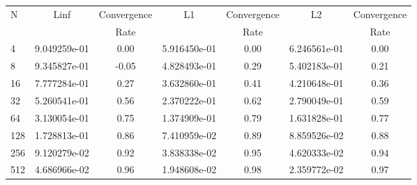 \documentclass[12pt]{article}
\begin{document}
	\begin{tabular}{l|c|c|c|c|c|c}
		N&Linf&Convergence&L1&Convergence&L2&Convergence\\
		&&Rate&&Rate&&Rate\\
		\hline
		4&9.049259e-01&0.00&5.916450e-01&0.00&6.246561e-01&0.00\\
		\hline
		8&9.345827e-01&-0.05&4.828493e-01&0.29&5.402183e-01&0.21\\
		\hline
		16&7.777284e-01&0.27&3.632860e-01&0.41&4.210648e-01&0.36\\
		\hline
		32&5.260541e-01&0.56&2.370222e-01&0.62&2.790049e-01&0.59\\
		\hline
		64&3.130054e-01&0.75&1.374909e-01&0.79&1.631828e-01&0.77\\
		\hline
		128&1.728813e-01&0.86&7.410959e-02&0.89&8.859526e-02&0.88\\
		\hline
		256&9.120279e-02&0.92&3.838338e-02&0.95&4.620333e-02&0.94\\
		\hline
		512&4.686966e-02&0.96&1.948608e-02&0.98&2.359772e-02&0.97\\
	\end{tabular}
\end{document}
